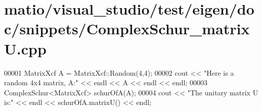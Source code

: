 \hypertarget{matio_2visual__studio_2test_2eigen_2doc_2snippets_2_complex_schur__matrix_u_8cpp_source}{}\section{matio/visual\+\_\+studio/test/eigen/doc/snippets/\+Complex\+Schur\+\_\+matrixU.cpp}
\label{matio_2visual__studio_2test_2eigen_2doc_2snippets_2_complex_schur__matrix_u_8cpp_source}

\begin{DoxyCode}
00001 MatrixXcf A = MatrixXcf::Random(4,4);
00002 cout << \textcolor{stringliteral}{"Here is a random 4x4 matrix, A:"} << endl << A << endl << endl;
00003 ComplexSchur<MatrixXcf> schurOfA(A);
00004 cout << \textcolor{stringliteral}{"The unitary matrix U is:"} << endl << schurOfA.matrixU() << endl;
\end{DoxyCode}
